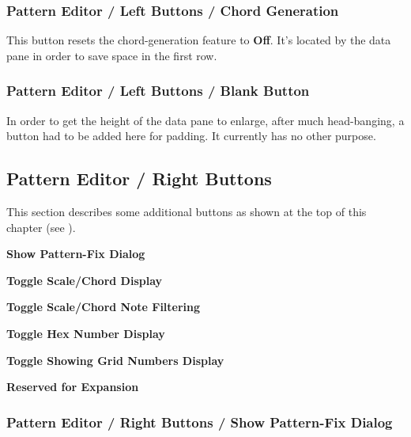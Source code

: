 \subsubsection{Pattern Editor / Left Buttons / Chord Generation}
\label{subsubsec:pattern_editor_left_buttons_chord_generation}

   This button resets the chord-generation feature to \textbf{Off}.
   It's located by the data pane in order to save space in the first row.

\subsubsection{Pattern Editor / Left Buttons / Blank Button}
\label{subsubsec:pattern_editor_left_buttons_blank_button}

   In order to get the height of the data pane to enlarge, after much
   head-banging, a button had to be added here for padding.
   It currently has no other purpose.

\subsection{Pattern Editor / Right Buttons}
\label{subsec:pattern_editor_right_buttons}

   This section describes some additional buttons as shown
   at the top of this chapter (see
   ).

   \begin{enumber}
      \item \textbf{Show Pattern-Fix Dialog}
      \item \textbf{Toggle Scale/Chord Display}
      \item \textbf{Toggle Scale/Chord Note Filtering}
      \item \textbf{Toggle Hex Number Display}
      \item \textbf{Toggle Showing Grid Numbers Display}
      \item \textbf{Reserved for Expansion}
   \end{enumber}

\subsubsection{Pattern Editor / Right Buttons / Show Pattern-Fix Dialog}
\label{subsubsec:pattern_editor_right_buttons_show_pattern_fix}

